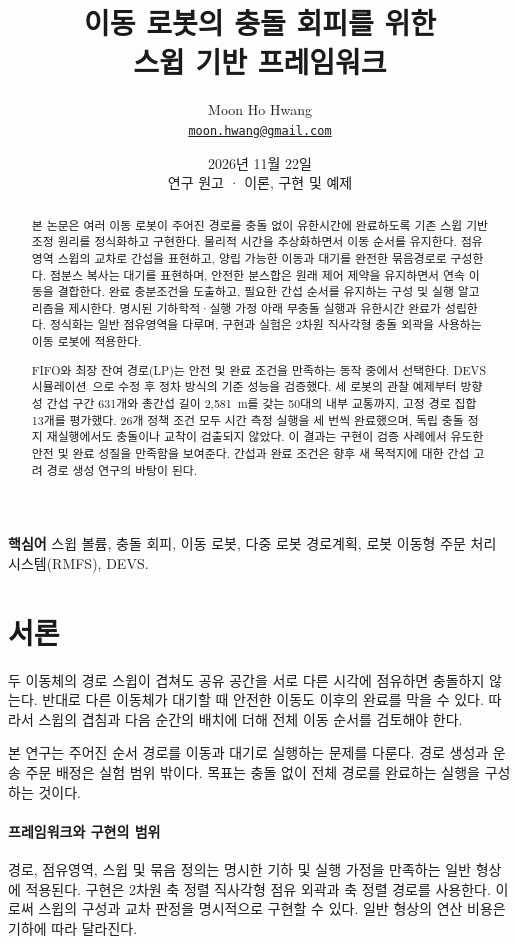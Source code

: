 \documentclass[11pt,a4paper]{article}
\title{이동 로봇의 충돌 회피를 위한\\스윕 기반 프레임워크}
\author{Moon Ho Hwang\\\small\href{mailto:moon.hwang@gmail.com}{\texttt{moon.hwang@gmail.com}}}
\date{2026년 11월 22일\\\small 연구 원고 · 이론, 구현 및 예제}
\theoremstyle{remark}
\begin{document}
\maketitle
\begin{abstract}
본 논문은 여러 이동 로봇이 주어진 경로를 충돌 없이 유한시간에 완료하도록 기존 스윕 기반 조정 원리를 정식화하고 구현한다. 물리적 시간을 추상화하면서 이동 순서를 유지한다. 점유영역 스윕의 교차로 간섭을 표현하고, 양립 가능한 이동과 대기를 완전한 묶음경로로 구성한다. 점분스 복사는 대기를 표현하며, 안전한 분스합은 원래 제어 제약을 유지하면서 연속 이동을 결합한다. 완료 충분조건을 도출하고, 필요한 간섭 순서를 유지하는 구성 및 실행 알고리즘을 제시한다. 명시된 기하학적·실행 가정 아래 무충돌 실행과 유한시간 완료가 성립한다. 정식화는 일반 점유영역을 다루며, 구현과 실험은 2차원 직사각형 충돌 외곽을 사용하는 이동 로봇에 적용한다.

FIFO와 최장 잔여 경로(LP)는 안전 및 완료 조건을 만족하는 동작 중에서 선택한다. DEVS 시뮬레이션~\cite{zeigler1976,zeigler2018}으로 수정 후 정차 방식의 기준 성능을 검증했다. 세 로봇의 관찰 예제부터 방향성 간섭 구간 631개와 총간섭 길이 2,581~m를 갖는 50대의 내부 교통까지, 고정 경로 집합 13개를 평가했다. 26개 정책 조건 모두 시간 측정 실행을 세 번씩 완료했으며, 독립 충돌 정지 재실행에서도 충돌이나 교착이 검출되지 않았다. 이 결과는 구현이 검증 사례에서 유도한 안전 및 완료 성질을 만족함을 보여준다. 간섭과 완료 조건은 향후 새 목적지에 대한 간섭 고려 경로 생성 연구의 바탕이 된다.
\end{abstract}
\noindent\textbf{핵심어} 스윕 볼륨, 충돌 회피, 이동 로봇, 다중 로봇 경로계획, 로봇 이동형 주문 처리 시스템(RMFS), DEVS.

\section{서론}
두 이동체의 경로 스윕이 겹쳐도 공유 공간을 서로 다른 시각에 점유하면 충돌하지 않는다. 반대로 다른 이동체가 대기할 때 안전한 이동도 이후의 완료를 막을 수 있다. 따라서 스윕의 겹침과 다음 순간의 배치에 더해 전체 이동 순서를 검토해야 한다.

본 연구는 주어진 순서 경로를 이동과 대기로 실행하는 문제를 다룬다. 경로 생성과 운송 주문 배정은 실험 범위 밖이다. 목표는 충돌 없이 전체 경로를 완료하는 실행을 구성하는 것이다.

\paragraph{프레임워크와 구현의 범위}
경로, 점유영역, 스윕 및 묶음 정의는 명시한 기하 및 실행 가정을 만족하는 일반 형상에 적용된다. 구현은 2차원 축 정렬 직사각형 점유 외곽과 축 정렬 경로를 사용한다. 이로써 스윕의 구성과 교차 판정을 명시적으로 구현할 수 있다. 일반 형상의 연산 비용은 기하에 따라 달라진다.
\end{document}

